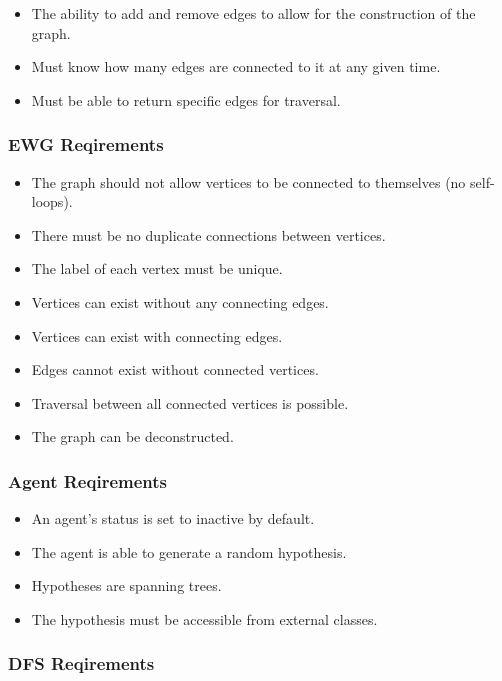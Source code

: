 \documentclass{AISB2008}
\begin{document}
{\begin{itemize}
\item The ability to add and remove edges to allow for the construction of the graph.
\item Must know how many edges are connected to it at any given time.
\item Must be able to return specific edges for traversal.
\end{itemize}


\subsubsection{EWG Reqirements}

\begin{itemize}
\item The graph should not allow vertices to be connected to themselves (no self-loops).
\item There must be no duplicate connections between vertices.
\item The label of each vertex must be unique.
\item Vertices can exist without any connecting edges.
\item Vertices can exist with connecting edges.
\item Edges cannot exist without connected vertices.
\item Traversal between all connected vertices is possible.
\item The graph can be deconstructed.
\end{itemize}


\subsubsection{Agent Reqirements}

\begin{itemize}
\item An agent’s status is set to inactive by default.
\item The agent is able to generate a random hypothesis.
\item Hypotheses are spanning trees.
\item The hypothesis must be accessible from external classes.
\end{itemize}


\subsubsection{DFS Reqirements}

}
\end{document}

